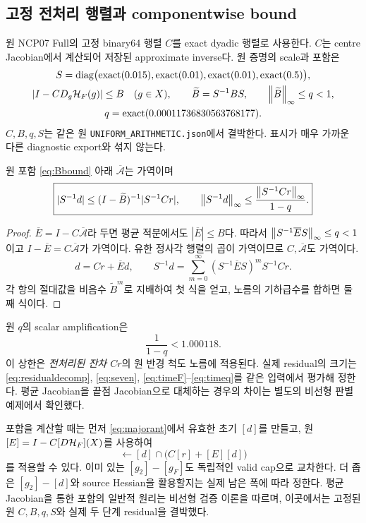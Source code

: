\subsection{고정 전처리 행렬과 componentwise bound}
원 NCP07 Full의 고정 binary64 행렬 $C$를 exact dyadic 행렬로 사용한다.
$C$는 centre Jacobian에서 계산되어 저장된 approximate inverse다. 원 증명의 scale과 포함은
\begin{gather}
S=\operatorname{diag}\bigl(\operatorname{exact}(0.015),\operatorname{exact}(0.01),\operatorname{exact}(0.01),\operatorname{exact}(0.5)\bigr),
\label{eq:S}\\
|I-CD_g\mathcal H_F(g)|\le B\quad(g\in X),\qquad
\widetilde B=S^{-1}BS,\qquad
\left\lVert \widetilde B\right\rVert_\infty\le q<1,\label{eq:Bbound}\\
q=\operatorname{exact}(0.00011736830563768177).
\label{eq:q}
\end{gather}
$C,B,q,S$는 같은 원 \texttt{UNIFORM\_ARITHMETIC.json}에서 결박한다.
표시가 매우 가까운 다른 diagnostic export와 섞지 않는다.\cite{preconditioner}

\begin{theorem}\label{thm:majorant}
원 포함 \eqref{eq:Bbound} 아래 $\overline{\mathcal A}$는 가역이며
\begin{equation}
\boxed{
|S^{-1}d|\le(I-\widetilde B)^{-1}|S^{-1}Cr|,
\qquad
\left\lVert S^{-1}d\right\rVert_\infty\le\frac{\left\lVert S^{-1}Cr\right\rVert_\infty}{1-q}.
}
\label{eq:majorant}
\end{equation}
\end{theorem}
\begin{proof}
$\overline E=I-C\overline{\mathcal A}$라 두면 평균 적분에서도
$|\overline E|\le B$다. 따라서
$\left\lVert S^{-1}\overline ES\right\rVert_\infty\le q<1$이고 $I-\overline E=C\overline{\mathcal A}$가 가역이다.
유한 정사각 행렬의 곱이 가역이므로 $C,\overline{\mathcal A}$도 가역이다.
\[
d=Cr+\overline E d,\qquad
S^{-1}d=\sum_{m=0}^{\infty}(S^{-1}\overline ES)^mS^{-1}Cr.
\]
각 항의 절대값을 비음수 $\widetilde B^m$로 지배하여 첫 식을 얻고,
노름의 기하급수를 합하면 둘째 식이다.
\end{proof}

원 $q$의 scalar amplification은
\begin{equation}
\frac1{1-q}<1.000118.
\label{eq:amplification}
\end{equation}
이 상한은 \emph{전처리된 잔차 $Cr$}의 원 반경 척도 노름에 적용된다.
실제 residual의 크기는 \eqref{eq:residualdecomp},
\eqref{eq:seven}, \eqref{eq:timeF}--\eqref{eq:timeq}를 같은 입력에서 평가해 정한다.
평균 Jacobian을 끝점 Jacobian으로 대체하는 경우의 차이는 별도의
비선형 판별 예제에서 확인했다.

포함을 계산할 때는 먼저 \eqref{eq:majorant}에서 유효한 초기 $[d]$를 만들고,
원 $[E]=I-C[D\mathcal H_F](X)$를 사용하여
\begin{equation}
[d]\leftarrow[d]\cap\bigl(C[r]+[E][d]\bigr)
\label{eq:refine}
\end{equation}
를 적용할 수 있다. 이미 있는 $[g_2]-[g_F]$도 독립적인 valid cap으로 교차한다.
더 좁은 $[g_2]-[d]$와 source Hessian을 활용할지는 실제 남은 폭에 따라 정한다.
평균 Jacobian을 통한 포함의 일반적 원리는 비선형 검증 이론을 따르며,
이곳에서는 고정된 원 $C,B,q,S$와 실제 두 단계 residual을 결박했다.\cite{rump}

